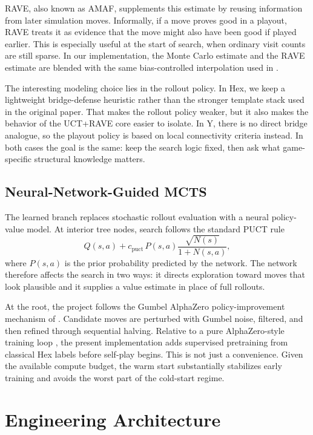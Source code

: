 \documentclass[11pt,a4paper]{article}
\begin{document}
RAVE, also known as AMAF, supplements this estimate by reusing information from
later simulation moves. Informally, if a move proves good in a playout, RAVE
treats it as evidence that the move might also have been good if played
earlier. This is especially useful at the start of search, when ordinary visit
counts are still sparse. In our implementation, the Monte Carlo estimate and
the RAVE estimate are blended with the same bias-controlled interpolation used
in \cite{cazenave2010montecarlohex}.

The interesting modeling choice lies in the rollout policy. In Hex, we keep a
lightweight bridge-defense heuristic rather than the stronger template stack
used in the original paper. That makes the rollout policy weaker, but it also
makes the behavior of the UCT+RAVE core easier to isolate. In Y, there is no
direct bridge analogue, so the playout policy is based on local connectivity
criteria instead. In both cases the goal is the same: keep the search logic
fixed, then ask what game-specific structural knowledge matters.

\subsection{Neural-Network-Guided MCTS}

The learned branch replaces stochastic rollout evaluation with a neural
policy-value model. At interior tree nodes, search follows the standard PUCT
rule
\[
Q(s,a)+c_{\mathrm{puct}}\,P(s,a)\frac{\sqrt{N(s)}}{1+N(s,a)},
\]
where $P(s,a)$ is the prior probability predicted by the network. The network
therefore affects the search in two ways: it directs exploration toward moves
that look plausible and it supplies a value estimate in place of full
rollouts.

At the root, the project follows the Gumbel AlphaZero policy-improvement
mechanism of \cite{danihelka2022gumbel}. Candidate moves are perturbed with
Gumbel noise, filtered, and then refined through sequential halving. Relative
to a pure AlphaZero-style training loop \cite{silver2017mastering}, the present
implementation adds supervised pretraining from classical Hex labels before
self-play begins. This is not just a convenience. Given the available compute
budget, the warm start substantially stabilizes early training and avoids the
worst part of the cold-start regime.

\section{Engineering Architecture}
\end{document}
